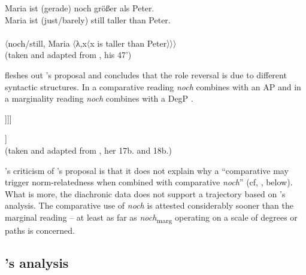 \documentclass[output=paper
,modfonts
,nonflat]{langsci/langscibook}
\begin{document}
\ea\gll Maria ist (gerade) noch größer als Peter.\\
       Maria ist {(just/barely)} still taller than Peter.\\
 \label{NOCH_MARG_EXP} \\
\z
\ea 〈noch/still, Maria 〈λ,x〈x is taller than Peter〉〉〉 \label{koenigs_noch_marg} \\ (taken and adapted from \citeyearpar{koenig1977}, his 47')\z


\noindent\citet{umbach2009a_comp} fleshes out \citeauthor{koenig1977}'s \citeyearpar{koenig1977} proposal and concludes that the role reversal is due to different syntactic structures. In a comparative reading \textit{noch} combines with an AP  and in a marginality reading \textit{noch} combines with a DegP .

\begin{exe}
\label{NOCH_COMP_EXPPrime}\relax [$_{\textnormal{\footnotesize{CP}}}$ Maria [$_{\textnormal{\footnotesize{VP}}}$ ist [$_{\textnormal{\footnotesize{DegP}}}$ \textbf{[$_{\textbf{\footnotesize{AP}}}$ noch [$_{\textbf{\footnotesize{AP}}}$ größer ]]} [als Adam]]]] 
\end{exe}

\begin{exe}
\label{NOCH_MARG_EXPPrime}\relax [$_{\textnormal{\footnotesize{CP}}}$ Maria [$_{\textnormal{\footnotesize{VP}}}$ ist \textbf{[$_{\textbf{\footnotesize{DegP}}}$ noch [$_{\textbf{\footnotesize{DegP}}}$ [$_{\textbf{\footnotesize{AP}}}$ größer] [als Peter]]]} ]] \\ (taken and adapted from \citeyearpar{umbach2009a_comp}, her 17b. and 18b.)
\end{exe}


\noindent\citeauthor{umbach2009a_comp}'s \citeyearpar{umbach2009a_comp} criticism of \citeauthor{koenig1977}'s \citeyearpar{koenig1977} proposal is that it does not explain why a ``comparative may trigger norm-relatedness when combined with comparative \textit{noch}'' (cf, , below). What is more, the diachronic data does not support a trajectory based on \citeauthor{koenig1977}'s analysis. The comparative use of \textit{noch} is attested considerably sooner than the marginal reading -- at least as far as \textit{noch}\textsubscript{marg} operating on a scale of degrees or paths is concerned.

\subsection{\citeauthor{umbach2009a_comp}'s \citeyearpar{umbach2009a_comp} analysis} \label{SubSec_umbach_analysis}
\end{document}
